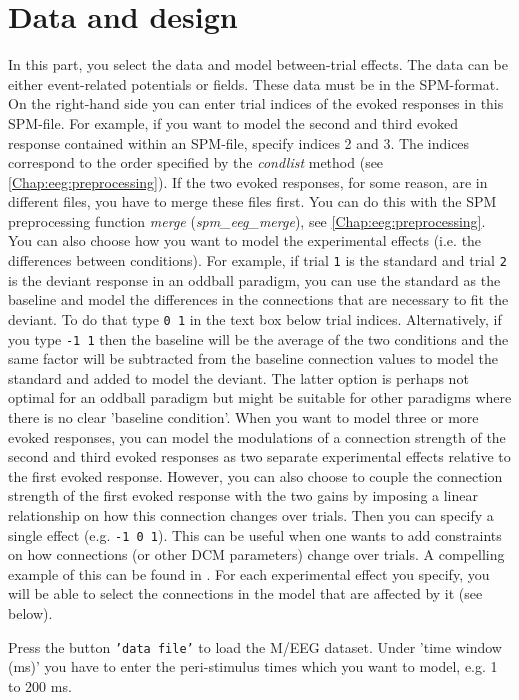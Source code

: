 \section{Data and design}
In this part, you select the data and model between-trial
effects. The data can be either event-related
potentials or fields. These data must be in the SPM-format. On the
right-hand side you can enter trial indices of the evoked responses in
this SPM-file. For example, if you want to model the
second and third evoked response contained within an SPM-file, specify
indices 2 and 3. The indices correspond to the order specified by the \textit{condlist} method (see \ref{Chap:eeg:preprocessing}). If the two evoked responses, for some reason, are in
different files, you have to merge these files first. You can do this
with the SPM preprocessing function \textit{merge}
(\textit{spm\_eeg\_merge}), see \ref{Chap:eeg:preprocessing}. You can also choose how you want to
model the experimental effects (i.e. the differences between conditions). For example, if trial \texttt{1} is the standard and trial \texttt{2} is the deviant response in an oddball paradigm, you can use the standard as the baseline and model the differences in the connections that are necessary to fit the deviant. To do that type \texttt{0 1} in the text box below trial indices. Alternatively, if you type \texttt{-1 1} then the baseline will be the average of the two conditions and the same factor will be subtracted from the baseline connection values to model the standard and added to model the deviant. The latter option is  perhaps not optimal for an oddball paradigm but might be suitable for other paradigms where there is no clear 'baseline condition'.  When you want to model three or more evoked responses, you can model the modulations of a connection strength of the second and third evoked responses as two separate experimental effects relative to the first evoked response. However, you can also choose to couple the connection strength of the first evoked response with the two gains by imposing a linear relationship on how this connection changes over trials. Then you can specify a single effect (e.g. \texttt{-1 0 1}).  This can be useful when one wants to add constraints on how connections (or other DCM parameters) change over trials. A compelling example of this can be found in \cite{marta_mmndcm}. For each experimental effect you specify, you will be able to select the connections in the model that are affected by it (see below).

Press the button \texttt{'data file'} to load the M/EEG dataset. Under 'time window (ms)' you have to enter the
peri-stimulus times which you want to model, e.g. 1 to 200 ms.

